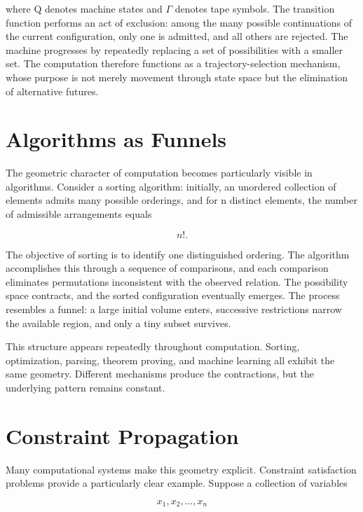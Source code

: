 \documentclass[11pt,oneside]{book}
\theoremstyle{plain}
\theoremstyle{definition}
\theoremstyle{remark}
\begin{document}
where Q denotes machine states and \(\Gamma\) denotes tape symbols. The transition function performs an act of exclusion: among the many possible continuations of the current configuration, only one is admitted, and all others are rejected. The machine progresses by repeatedly replacing a set of possibilities with a smaller set. The computation therefore functions as a trajectory-selection mechanism, whose purpose is not merely movement through state space but the elimination of alternative futures.

\section{Algorithms as Funnels}

The geometric character of computation becomes particularly visible in algorithms. Consider a sorting algorithm: initially, an unordered collection of elements admits many possible orderings, and for n distinct elements, the number of admissible arrangements equals

\begin{equation}
n!.
\end{equation}

The objective of sorting is to identify one distinguished ordering. The algorithm accomplishes this through a sequence of comparisons, and each comparison eliminates permutations inconsistent with the observed relation. The possibility space contracts, and the sorted configuration eventually emerges. The process resembles a funnel: a large initial volume enters, successive restrictions narrow the available region, and only a tiny subset survives.

This structure appears repeatedly throughout computation. Sorting, optimization, parsing, theorem proving, and machine learning all exhibit the same geometry. Different mechanisms produce the contractions, but the underlying pattern remains constant.

\section{Constraint Propagation}

Many computational systems make this geometry explicit. Constraint satisfaction problems provide a particularly clear example. Suppose a collection of variables

\begin{equation}
x_1,x_2,\ldots,x_n
\end{equation}
\end{document}
